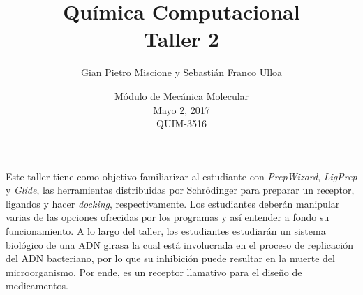 \documentclass{article}
\title{Química Computacional \\ Taller 2}
\date{Módulo de Mecánica Molecular \\ Mayo 2, 2017 \\ QUIM-3516 \\ }
\author{Gian Pietro Miscione y Sebastián Franco Ulloa}
\begin{document}
\maketitle

\begin{center}
Este taller tiene como objetivo familiarizar al estudiante con \emph{PrepWizard}, \emph{LigPrep} y \emph{Glide}, las herramientas distribuidas por Schr\"odinger para preparar un receptor, ligandos y hacer \emph{docking}, respectivamente. Los estudiantes deberán manipular varias de las opciones ofrecidas por los programas y así entender a fondo su funcionamiento. A lo largo del taller, los estudiantes estudiarán un sistema biológico de una ADN girasa la cual está involucrada en el proceso de replicación del ADN bacteriano, por lo que su inhibición puede resultar en la muerte del microorganismo. Por ende, es un receptor llamativo para el diseño de medicamentos. 

\end{center}
\end{document}
